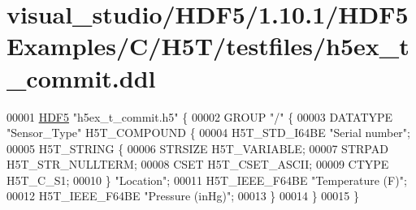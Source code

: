 \hypertarget{visual__studio_2_h_d_f5_21_810_81_2_h_d_f5_examples_2_c_2_h5_t_2testfiles_2h5ex__t__commit_8ddl_source}{}\section{visual\+\_\+studio/\+H\+D\+F5/1.10.1/\+H\+D\+F5\+Examples/\+C/\+H5\+T/testfiles/h5ex\+\_\+t\+\_\+commit.ddl}
\label{visual__studio_2_h_d_f5_21_810_81_2_h_d_f5_examples_2_c_2_h5_t_2testfiles_2h5ex__t__commit_8ddl_source}

\begin{DoxyCode}
00001 \hyperlink{namespace_h_d_f5}{HDF5} \textcolor{stringliteral}{"h5ex\_t\_commit.h5"} \{
00002 GROUP \textcolor{stringliteral}{"/"} \{
00003    DATATYPE \textcolor{stringliteral}{"Sensor\_Type"} H5T\_COMPOUND \{
00004       H5T\_STD\_I64BE \textcolor{stringliteral}{"Serial number"};
00005       H5T\_STRING \{
00006          STRSIZE H5T\_VARIABLE;
00007          STRPAD H5T\_STR\_NULLTERM;
00008          CSET H5T\_CSET\_ASCII;
00009          CTYPE H5T\_C\_S1;
00010       \} \textcolor{stringliteral}{"Location"};
00011       H5T\_IEEE\_F64BE \textcolor{stringliteral}{"Temperature (F)"};
00012       H5T\_IEEE\_F64BE \textcolor{stringliteral}{"Pressure (inHg)"};
00013    \}
00014 \}
00015 \}
\end{DoxyCode}

